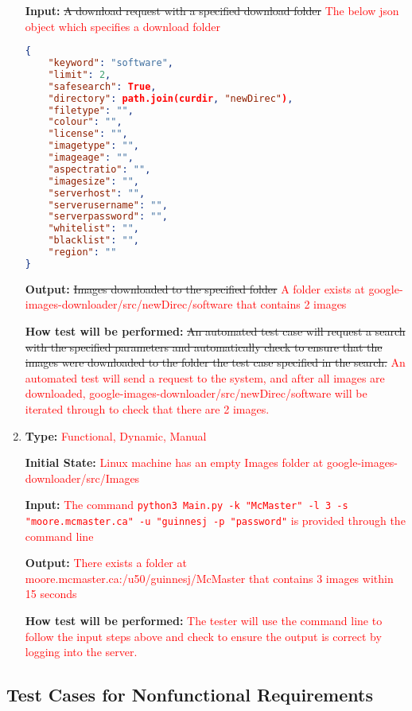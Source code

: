 \documentclass[12pt, titlepage]{article}
\begin{document}
\begin{enumerate}[label=FR-DL\arabic*:, wide=0pt, leftmargin=*]
\textbf{Input:} \sout{A download request with a specified download folder}
\textcolor{red}{The below json object which specifies a download folder}
\begin{lstlisting}[language=json,firstnumber=1]
{
    "keyword": "software",
    "limit": 2,
    "safesearch": True,
    "directory": path.join(curdir, "newDirec"),
    "filetype": "",
    "colour": "",
    "license": "",
    "imagetype": "",
    "imageage": "",
    "aspectratio": "",
    "imagesize": "",
    "serverhost": "",
    "serverusername": "",
    "serverpassword": "",
    "whitelist": "",
    "blacklist": "",
    "region": ""
}
\end{lstlisting}
					
\textbf{Output:} \sout{Images downloaded to the specified folder}
\textcolor{red}{A folder exists at google-images-downloader/src/newDirec/software that contains 2 images}
					
\textbf{How test will be performed:} \sout{An automated test case will request a search with the 
specified parameters and automatically check to ensure that the images were downloaded to 
the folder the test case specified in the search.}
\textcolor{red}{An automated test will send a request to the system, and after all images are downloaded, 
google-images-downloader/src/newDirec/software will be iterated through to check that there are 2 images.}

\item \phantom{empty}

\textbf{Type:} \textcolor{red}{Functional, Dynamic, Manual}

\textbf{Initial State:} \textcolor{red}{Linux machine has an empty Images folder at google-images-downloader/src/Images}

\textbf{Input:} \textcolor{red}{The command \texttt{python3 Main.py -k "McMaster" -l 3 -s "moore.mcmaster.ca" -u "guinnesj -p "password"}
is provided through the command line}

\textbf{Output:} \textcolor{red}{There exists a folder at moore.mcmaster.ca:/u50/guinnesj/McMaster that contains 3 images within 15 seconds}

\textbf{How test will be performed:} \textcolor{red}{The tester will use the command line to follow the input steps above and 
check to ensure the output is correct by logging into the server.}


\end{enumerate}


\subsection{Test Cases for Nonfunctional Requirements}
\end{document}
